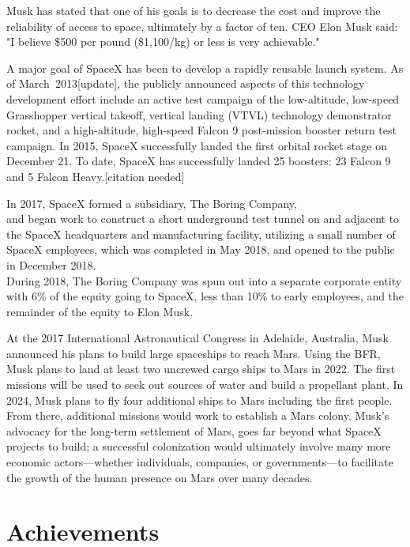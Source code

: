 Musk has stated that one of his goals is to decrease the cost and
improve the reliability of access to space, ultimately by a factor of
ten. CEO Elon Musk said: "I believe \$500 per pound (\$1,100/kg) or less
is very achievable."

A major goal of SpaceX has been to develop a rapidly reusable launch
system. As of March~2013{[}update{]}, the publicly announced aspects of
this technology development effort include an active test campaign of
the low-altitude, low-speed Grasshopper vertical takeoff, vertical
landing (VTVL) technology demonstrator rocket, and a high-altitude,
high-speed Falcon 9 post-mission booster return test campaign. In 2015,
SpaceX successfully landed the first orbital rocket stage on December
21. To date, SpaceX has successfully landed 25 boosters: 23 Falcon 9 and
5 Falcon Heavy.{[}citation needed{]}

In 2017, SpaceX formed a subsidiary, The Boring Company,\\
and began work to construct a short underground test tunnel on and
adjacent to the SpaceX headquarters and manufacturing facility,
utilizing a small number of SpaceX employees, which was completed in May
2018, and opened to the public in December 2018.\\
During 2018, The Boring Company was spun out into a separate corporate
entity with 6\% of the equity going to SpaceX, less than 10\% to early
employees, and the remainder of the equity to Elon Musk.

At the 2017 International Astronautical Congress in Adelaide, Australia,
Musk announced his plans to build large spaceships to reach Mars. Using
the BFR, Musk plans to land at least two uncrewed cargo ships to Mars in
2022. The first missions will be used to seek out sources of water and
build a propellant plant. In 2024, Musk plans to fly four additional
ships to Mars including the first people. From there, additional
missions would work to establish a Mars colony. Musk's advocacy for the
long-term settlement of Mars, goes far beyond what SpaceX projects to
build; a successful colonization would ultimately involve many more
economic actors---whether individuals, companies, or governments---to
facilitate the growth of the human presence on Mars over many decades.

\section{Achievements}\label{achievements}

